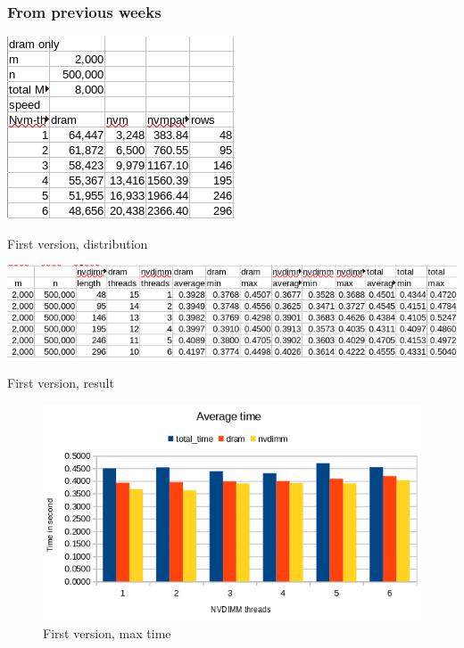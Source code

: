\documentclass[12pt,a4paper,USenglish]{article}      %
\begin{document}
\clearpage
\subsubsection{From previous weeks}

\begin{table}[!hbtp]
\includegraphics[scale=0.6]{Large_Array_test/First_version_2k_500k_Distibution.png}
\caption{First version, distribution}
\end{table}

\begin{table}[!hbtp]
\includegraphics[scale=0.6]{Large_Array_test/First_version_2k_500k_Table.png}
\caption{First version, result}
\end{table}

\begin{figure}[!hbtp]
\includegraphics[scale=0.7]{Large_Array_test/First_version_2k_500k_average.png}
\caption{First version, max time}
\end{figure}
\end{document}
